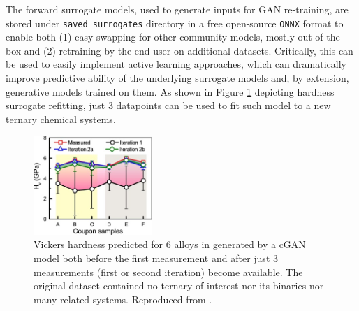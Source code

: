 The forward surrogate models, used to generate inputs for GAN re-training, are stored under \texttt{saved\_surrogates} directory in a free open-source \texttt{ONNX} format to enable both (1) easy swapping for other community models, mostly out-of-the-box and (2) retraining by the end user on additional datasets. Critically, this can be used to easily implement active learning approaches, which can dramatically improve predictive ability of the underlying surrogate models and, by extension, generative models trained on them. As shown in Figure \ref{inverse:fig:activelearn} depicting hardness surrogate refitting, just 3 datapoints can be used to fit such model to a new ternary chemical systems.

\begin{figure}[H]
    \centering
    \includegraphics[width=0.4\textwidth]{inversedesign/inverse_active.jpg}
    \caption{Vickers hardness predicted for 6  alloys in \cite{Li2024DesignExperiments} generated by a cGAN model both before the first measurement and after just 3 measurements (first or second iteration) become available. The original dataset contained no ternary of interest nor its binaries nor many related systems. Reproduced from \cite{Li2024DesignExperiments}.}
    \label{inverse:fig:activelearn}
\end{figure}







\printbibliography[heading=subbibintoc]